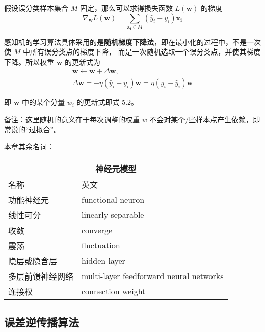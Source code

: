 \documentclass[../studies-ml.tex]{subfiles}
\begin{document}
\begin{enumerate}[I]
        假设误分类样本集合 $M$ 固定，那么可以求得损失函数 $L(\pmb{w})$ 的梯度
        \[ \nabla_{\pmb{w}} L(\pmb{w}) = \sum_{\pmb{x_i} \in M} (\hat{y}_i - y_i) \pmb{x_i} \]

        感知机的学习算法具体采用的是\textbf{随机梯度下降法}，即在最小化的过程中，不是一次使 $M$ 中所有误分类点的梯度下降，
        而是一次随机选取一个误分类点，并使其梯度下降。所以权重 $\pmb{w}$ 的更新式为
        \begin{gather*}
          \pmb{w} \leftarrow \pmb{w} + \Delta \pmb{w}, \\
          \Delta \pmb{w} = -\eta (\hat{y}_i - y_i) \pmb{w} = \eta (y_i - \hat{y}_i) \pmb{w}
        \end{gather*}

        即 $\pmb{w}$ 中的某个分量 $w_i$ 的更新式即式 5.2。

        备注：这里随机的意义在于每次调整的权重 $w$ 不会对某个/些样本点产生依赖，即常说的“过拟合”。
\end{enumerate}

本章其余名词：

\begin{center}
  \begin{tabular}{ |p{4cm}||p{7cm}|  }
    \hline
    \multicolumn{2}{|c|}{\textbf{神经元模型}}               \\
    \hline
    名称       & 英文                                      \\
    \hline
    功能神经元    & functional neuron                       \\
    \hline
    线性可分     & linearly separable                      \\
    \hline
    收敛       & converge                                \\
    \hline
    震荡       & fluctuation                             \\
    \hline
    隐层或隐含层   & hidden layer                            \\
    \hline
    多层前馈神经网络 & multi-layer feedforward neural networks \\
    \hline
    连接权      & connection weight                       \\
    \hline
  \end{tabular}
\end{center}

\newpage

\subsection{误差逆传播算法}
\end{document}

